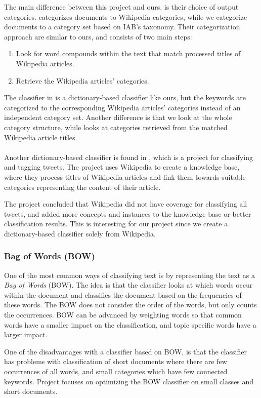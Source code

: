 The main difference between this project and ours, is their choice of output categories. \cite{schonhofen2009identifying} categorizes documents to  Wikipedia categories, while we categorize documents to a category set based on IAB's taxonomy. Their categorization approach are similar to ours, and consists of two main steps: 
\begin{enumerate}
\item Look for word compounds within the text that match processed titles of Wikipedia articles. 
\item Retrieve the Wikipedia articles' categories. 
\end{enumerate}
The classifier in \cite[][]{schonhofen2009identifying} is a dictionary-based classifier like ours, but the keywords are categorized to the corresponding Wikipedia articles' categories instead of an independent category set. Another difference is that we look at the whole category structure, while \cite{schonhofen2009identifying} looks at categories retrieved from the matched Wikipedia article titles. \\\\
Another dictionary-based classifier is found in \cite{entityextraction}, which is a project for classifying and tagging tweets. The project uses Wikipedia to create a knowledge base, where they process titles of Wikipedia articles and link them towards suitable categories representing the content of their article. 


The project concluded that Wikipedia did not have coverage for classifying all tweets, and added more concepts and instances to the knowledge base or better classification results. This is interesting for our project since we create a dictionary-based classifier solely from Wikipedia.


\subsubsection{Bag of Words (BOW)}
One of the most common ways of classifying text is by representing the text as a \emph{Bag of Words} (BOW). %
The idea is that the classifier looks at which words occur within the document and classifies the document based on the frequencies of these words. The BOW does not consider the order of the words, but only counts the occurrences. BOW can be advanced by weighting words so that common words have a smaller impact on the classification, and topic specific words have a larger impact. 

One of the disadvantages with a classifier based on BOW, is that the classifier has problems with classification of short documents where there are few occurrences of all words, and small categories which have few connected keywords. Project \cite{brittleness} focuses on optimizing the BOW classifier on small classes and short documents. 

